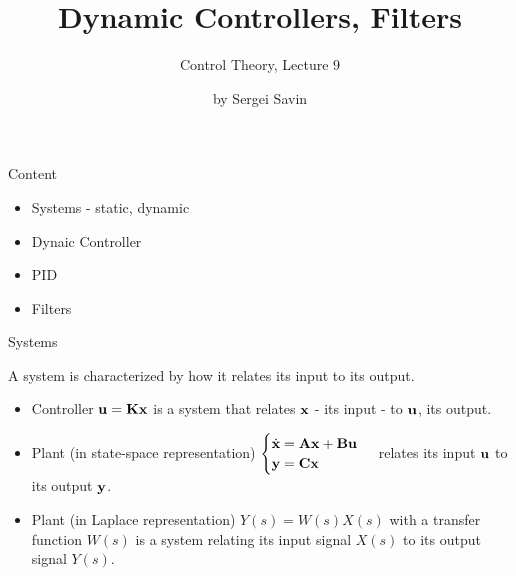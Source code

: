 \documentclass{beamer}
\title{Dynamic Controllers, Filters}
\subtitle{Control Theory, Lecture 9}
\author{by Sergei Savin}
\date{\mydate}
\begin{document}
\maketitle



\begin{frame}{Content}
\begin{itemize}
\item Systems - static, dynamic
\item Dynaic Controller
\item PID
\item Filters
\end{itemize}
\end{frame}




\begin{frame}{Systems}
\begin{flushleft}

A system is characterized by how it relates its input to its output.

\begin{itemize}
	\item Controller $\mathbf{u} = \mathbf{K}\mathbf{x}$ is a system that relates $\mathbf{x}$ - its input - to $\mathbf{u}$, its output. 
	
	\item Plant (in state-space representation) 
$\begin{cases}
		\dot {\mathbf{x}} = \mathbf{A} \mathbf{x} + \mathbf{B} \mathbf{u} \\
		\mathbf{y} = \mathbf{C} \mathbf{x}
	\end{cases}$ 
relates its input $\mathbf{u}$ to its output $\mathbf{y}$.

	\item Plant (in Laplace representation) $Y(s) = W(s)X(s)$ with a transfer function $W(s)$ is a system relating its input signal $X(s)$ to its output signal $Y(s)$.
\end{itemize}

\end{flushleft}
\end{frame}
\end{document}
